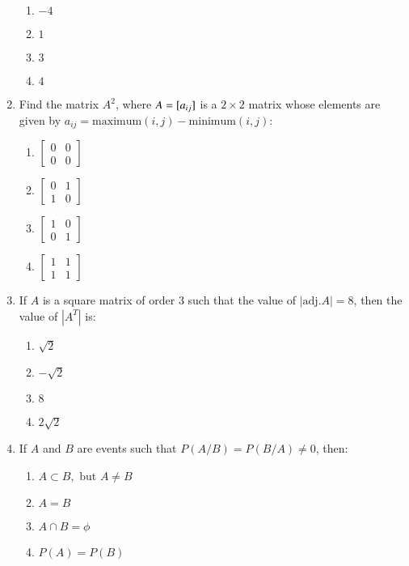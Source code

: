 \documentclass[12pt,-letter paper]{article}
\providecommand{\myvec}[1]{\ensuremath{\begin{bmatrix}#1\end{bmatrix}}}
\providecommand{\brak}[1]{\ensuremath{\left(#1\right)}}
\begin{document}
\begin{enumerate}
     \begin{enumerate}[label={$\brak{\Alph*}$}]                               \item $-4$                                                          \item $1$                                                              \item $3$
        \item $4$                                                         \end{enumerate}                                                   
	\item Find the matrix $A^2$, where $A = \text[a_{ij}]$    is a        $2 \times 2 $ matrix whose elements are given by $ a_{ij} = \text{maximum}(i, j) - \text{minimum}(i, j)$:                                                  \begin{enumerate}[label={$\brak{\Alph*}$}]
       \item $\myvec{0 & 0 \\ 0 & 0}$
        \item $\myvec{0 & 1 \\ 1 & 0}$
        \item $\myvec{1 & 0 \\ 0 & 1}$
        \item $\myvec{1 & 1 \\ 1 & 1}$
    \end{enumerate}

    \item If $A$ is a square matrix of order $3$ such that the value of \(|\text{adj}.A| = 8\), then the value of \(|A^T|\) is:
            \begin{enumerate}[label={$\brak{\Alph*}$}]
        \item $\sqrt{2}$
        \item $-\sqrt{2}$
        \item $8$
        \item $2\sqrt{2}$
    \end{enumerate}

    \item If $A$ and $B$ are events such that $P$\brak{A/B}$ = P$\brak{B/A}$ \neq 0$, then:
            \begin{enumerate}[label={$\brak{\Alph*}$}]
        \item $A \subset B, \text{ but } A \neq B$
        \item $A = B$
        \item $A \cap B = \phi$
        \item $P(A) = P(B)$
    \end{enumerate}
\end{enumerate}
\end{document}
